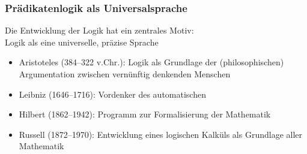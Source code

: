 \documentclass[aspectratio=1610,onlymath]{beamer}
\begin{document}
\maketitle

% 
% 
% 
% 

\begin{frame}\label{frame_logiker}\frametitle{Prädikatenlogik als Universalsprache}

Die Entwicklung der Logik hat ein zentrales Motiv:\\
\alert{Logik als eine universelle, präzise Sprache}\pause

\begin{itemize}
\item {}%
	Aristoteles (384--322 v.Chr.): Logik als Grundlage der (philosophischen) Argumentation zwischen vernünftig denkenden Menschen\pause
\item {}%
	Leibniz (1646--1716): Vordenker des automatischen \\
\pause
\item {}%
	Hilbert (1862--1942): Programm zur Formalisierung der Mathematik\pause
\item {}%
	Russell (1872--1970): Entwicklung eines logischen Kalküls als Grundlage aller Mathematik
\end{itemize}

\end{frame}
\end{document}
